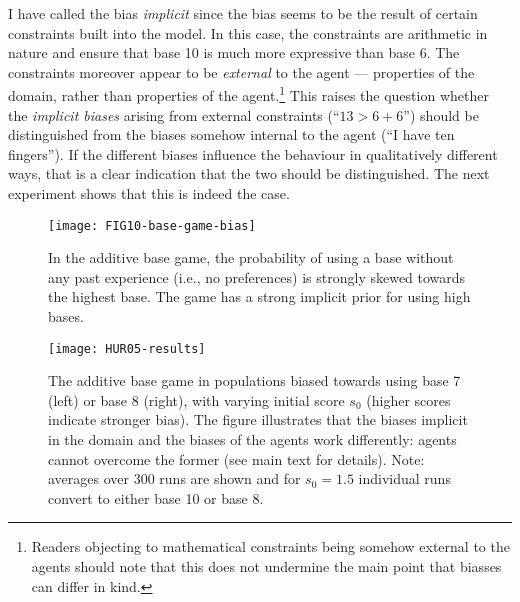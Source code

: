 \documentclass{../src/bcthesispart}
\begin{document}
I have called the bias \emph{implicit} since the bias seems to be the result of certain constraints built into the model.
In this case, the constraints are arithmetic in nature and ensure that base 10 is much more expressive than base 6.
The constraints moreover appear to be \emph{external} to the agent — properties of the domain, rather than properties of the agent.\footnote{%
	Readers objecting to mathematical constraints being somehow external to the agents should note that this does not undermine the main point that biasses can differ in kind.
	}
This raises the question whether the \emph{implicit biases} arising from external constraints (“$13 > 6+6$”) should be distinguished from the biases somehow internal to the agent (“I have ten fingers”).
If the different biases influence the behaviour in qualitatively different ways, that is a clear indication that the two should be distinguished.
The next experiment shows that this is indeed the case.




\begin{SCfigure}
	\texttt{[image: FIG10-base-game-bias]}	
	
	\caption{%
	In the additive base game, the probability of using a base without any past experience (i.e., no preferences) is strongly skewed towards the highest base.
	The game has a strong implicit prior for using high bases.
	\label{fig:FIG10-base-game-bias.pdf}}
\end{SCfigure}




\begin{SCfigure}
	\texttt{[image: HUR05-results]}	
	
	\caption{%
	The additive base game in populations biased towards using base 7 (left) or base 8 (right), with varying initial score $s_0$ (higher scores indicate stronger bias).
	The figure illustrates that the biases implicit in the domain and the biases of the agents work differently: agents cannot overcome the former (see main text for details).
	Note: averages over 300 runs are shown and for $s_0=1.5$ individual runs convert to either base 10 or base 8.
	\label{fig:effect-initial-conditions}}
\end{SCfigure}
\end{document}

